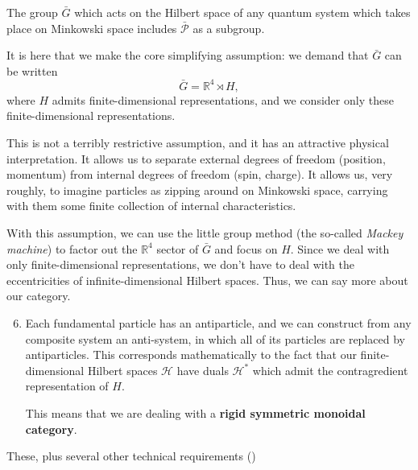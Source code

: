 \documentclass[a4paper,10pt]{scrreprt}
\newcommand{\R}{\mathbb{R}}
\theoremstyle{definition}
\theoremstyle{plain}
\theoremstyle{remark}
\begin{document}
The group $\bar{G}$ which acts on the Hilbert space of any quantum system which takes place on Minkowski space includes $\bar{\mathcal{P}}$ as a subgroup.

It is here that we make the core simplifying assumption: we demand that $\bar{G}$ can be written
\begin{equation*}
  \bar{G} = \R^{4} \rtimes H,
\end{equation*}
where $H$ admits finite-dimensional representations, and we consider only these finite-dimensional representations.

This is not a terribly restrictive assumption, and it has an attractive physical interpretation. It allows us to separate external degrees of freedom (position, momentum) from internal degrees of freedom (spin, charge). It allows us, very roughly, to imagine particles as zipping around on Minkowski space, carrying with them some finite collection of internal characteristics.

With this assumption, we can use the little group method (the so-called \emph{Mackey machine}) to factor out the $\R^{4}$ sector of $\bar{G}$ and focus on $H$. Since we deal with only finite-dimensional representations, we don't have to deal with the eccentricities of infinite-dimensional Hilbert spaces. Thus, we can say more about our category.
\begin{enumerate}
    \setcounter{enumi}{5}
  \item Each fundamental particle has an antiparticle, and we can construct from any composite system an anti-system, in which all of its particles are replaced by antiparticles. This corresponds mathematically to the fact that our finite-dimensional Hilbert spaces $\mathscr{H}$ have duals $\mathscr{H}^{*}$ which admit the contragredient representation of $H$.

    This means that we are dealing with a \textbf{rigid symmetric monoidal category}.
\end{enumerate}

These, plus several other technical requirements ()
\end{document}
